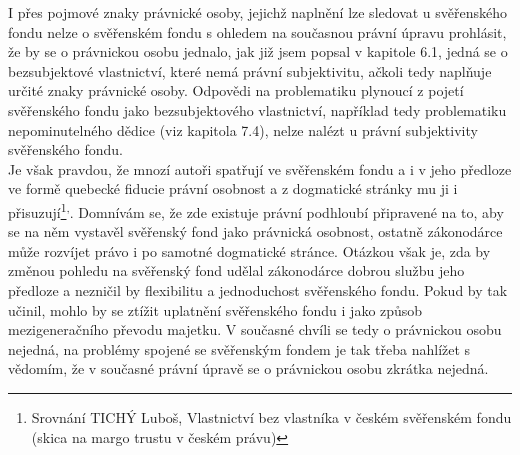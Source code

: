 \documentclass{article}
\begin{document}
I přes pojmové znaky právnické osoby, jejichž naplnění lze sledovat u svěřenského fondu nelze o svěřenském fondu s ohledem na současnou právní úpravu prohlásit, že by se o právnickou osobu jednalo, jak již jsem popsal v kapitole 6.1, jedná se o bezsubjektové vlastnictví, které nemá právní subjektivitu, ačkoli tedy naplňuje určité znaky právnické osoby. Odpovědi na problematiku plynoucí z pojetí svěřenského fondu jako bezsubjektového vlastnictví, například tedy problematiku nepominutelného dědice (viz kapitola 7.4), nelze nalézt u právní subjektivity svěřenského fondu.\\

Je však pravdou, že mnozí autoři spatřují ve svěřenském fondu a i v jeho předloze ve formě quebecké fiducie právní osobnost a z dogmatické stránky mu ji i přisuzují\footnote{Srovnání TICHÝ Luboš, Vlastnictví bez vlastníka v českém svěřenském fondu (skica na margo trustu v českém právu)}\textsuperscript{,}. Domnívám se, že zde existuje právní podhloubí připravené na to, aby se na něm vystavěl svěřenský fond jako právnická osobnost, ostatně zákonodárce může rozvíjet právo i po samotné dogmatické stránce. Otázkou však je, zda by změnou pohledu na svěřenský fond udělal zákonodárce dobrou službu jeho předloze a nezničil by flexibilitu a jednoduchost svěřenského fondu. Pokud by tak učinil, mohlo by se ztížit uplatnění svěřenského fondu i jako způsob mezigeneračního převodu majetku. V současné chvíli se tedy o právnickou osobu nejedná, na problémy spojené se svěřenským fondem je tak třeba nahlížet s vědomím, že v současné právní úpravě se o právnickou osobu zkrátka nejedná.\\


\end{document}
